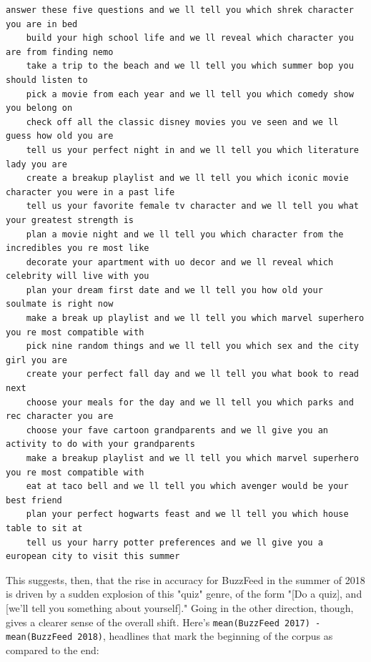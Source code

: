 \documentclass{scrartcl}
\begin{document}
\begin{lstlisting}[basicstyle=\tiny\hlfont]
    answer these five questions and we ll tell you which shrek character you are in bed
    build your high school life and we ll reveal which character you are from finding nemo
    take a trip to the beach and we ll tell you which summer bop you should listen to
    pick a movie from each year and we ll tell you which comedy show you belong on
    check off all the classic disney movies you ve seen and we ll guess how old you are
    tell us your perfect night in and we ll tell you which literature lady you are
    create a breakup playlist and we ll tell you which iconic movie character you were in a past life
    tell us your favorite female tv character and we ll tell you what your greatest strength is
    plan a movie night and we ll tell you which character from the incredibles you re most like
    decorate your apartment with uo decor and we ll reveal which celebrity will live with you
    plan your dream first date and we ll tell you how old your soulmate is right now
    make a break up playlist and we ll tell you which marvel superhero you re most compatible with
    pick nine random things and we ll tell you which sex and the city girl you are
    create your perfect fall day and we ll tell you what book to read next
    choose your meals for the day and we ll tell you which parks and rec character you are
    choose your fave cartoon grandparents and we ll give you an activity to do with your grandparents
    make a breakup playlist and we ll tell you which marvel superhero you re most compatible with
    eat at taco bell and we ll tell you which avenger would be your best friend
    plan your perfect hogwarts feast and we ll tell you which house table to sit at
    tell us your harry potter preferences and we ll give you a european city to visit this summer
\end{lstlisting}

This suggests, then, that the rise in accuracy for BuzzFeed in the summer of 2018 is driven by a sudden explosion of this "quiz" genre, of the form "[Do a quiz], and [we'll tell you something about yourself]." Going in the other direction, though, gives a clearer sense of the overall shift. Here's \texttt{mean(BuzzFeed 2017) - mean(BuzzFeed 2018)}, headlines that mark the beginning of the corpus as compared to the end:
\end{document}
